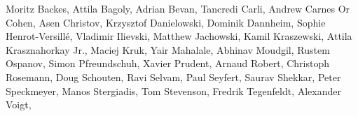 \begin{center}
{Moritz Backes, %
Attila Bagoly,
Adrian Bevan,
Tancredi Carli, %
Andrew Carnes
Or Cohen, %
Asen Christov, %
Krzysztof Danielowski, %
Dominik Dannheim, %
Sophie Henrot-Versill\'e, %
Vladimir Ilievski,
Matthew Jachowski, %
Kamil Kraszewski, %
Attila Krasznahorkay Jr., %
Maciej Kruk, %
Yair Mahalale, %
Abhinav Moudgil, %
Rustem Ospanov, %
Simon Pfreundschuh,
Xavier Prudent, %
Arnaud Robert, %
Christoph Rosemann, %
Doug Schouten, %
Ravi Selvam,
Paul Seyfert,
Saurav Shekkar,
Peter Speckmeyer,
Manos Stergiadis,
Tom Stevenson,
Fredrik Tegenfeldt, %
Alexander Voigt, %
}
\end{center}
